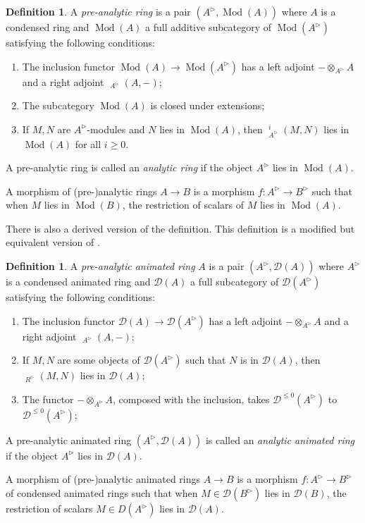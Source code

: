 \documentclass{article}
\theoremstyle{plain}
\theoremstyle{definition}
\newtheorem{defi}[thm]{Definition}
\theoremstyle{remark}
\DeclareMathOperator{\Homs}{\underline{Hom}}
\DeclareMathOperator{\rhoms}{\underline{RHom}}
\DeclareMathOperator{\modcat}{Mod}
\DeclareMathOperator{\exts}{\underline{Ext}}
\newcommand{\huflag}{\triangleright}
\newcommand{\D}{\mathcal{D}}
\begin{document}
\begin{defi}
A \emph{pre-analytic ring} is a pair $ (A ^{\huflag}, \modcat (A)) $ where $ A $ is a condensed ring and
$ \modcat (A) $ a full additive subcategory of $ \modcat (A ^{\huflag}) $ satisfying the following conditions:

\begin{enumerate}
\item The inclusion functor $ \modcat (A)\to \modcat (A ^{\huflag}) $ has a left adjoint
$ -\otimes _{A ^{\huflag}} A $ and a right adjoint $ \Homs _{A ^{\huflag}} (A, -) $;
\item The subcategory $ \modcat (A) $ is closed under extensions;
\item If $ M,N $ are $ A ^{\huflag} $-modules and $ N $ lies in $ \modcat (A) $,
then $ \exts ^{i} _{A ^{\huflag}} (M, N) $ lies in $ \modcat (A) $ for all $ i\geq 0 $.
\end{enumerate}
A pre-analytic ring is called an \emph{analytic ring} if the object $ A ^{\huflag} $ lies in $ \modcat (A) $.

A morphism of (pre-)analytic rings $ A\to B $ is a morphism $ f: A ^{\huflag}\to B ^{\huflag} $ such that
when $ M $ lies in $ \modcat (B) $, the restriction of scalars of $ M $ lies in $ \modcat (A) $.
\end{defi}

There is also a derived version of the definition.
This definition is a modified but equivalent version of \cite[\href
{https://www.youtube.com/watch?v=YxSZ1mTIpaA\&list=PLx5f8IelFRgGmu6gmL-Kf\_Rl\_6Mm7juZO\&t=3962s}{Video 1, 1:06:02}]{ihesvid}.

\begin{defi}
A \emph{pre-analytic animated ring} $ A $ is a pair $ (A ^{\huflag}, \D(A)) $ where $ A ^{\huflag} $ is a condensed animated ring and
$ \D (A) $ a full subcategory of $ \D (A ^{\huflag}) $ satisfying the following conditions:

\begin{enumerate}
\item The inclusion functor $ \D (A)\to \D (A ^{\huflag}) $ has a left adjoint $ -\otimes _{A ^{\huflag}} A $
and a right adjoint $ \Homs _{A ^{\huflag}}(A, -) $;
\item If $ M,N $ are some objects of $ \D (A ^{\huflag}) $ such that $ N $ is in $\D (A) $, then $ \rhoms _{R ^{\huflag}} (M, N) $ lies in $ \D (A) $;
\item The functor $ -\otimes _{A ^{\huflag}} A $, composed with the inclusion, takes $ \D ^{\leq 0}(A ^{\huflag}) $ to $ \D ^{\leq 0}(A ^{\huflag}) $;
\end{enumerate}
A pre-analytic animated ring $ (A ^{\huflag}, \D (A)) $ is called an \emph{analytic animated ring} if
the object $ A ^{\huflag} $ lies in $ \D (A) $.

A morphism of (pre-)analytic animated rings $ A\to B $ is a morphism $ f: A ^{\huflag}\to B ^{\huflag} $ of condensed animated rings such that when
$ M\in \D (B ^{\huflag}) $ lies in $ \D (B) $, the restriction of scalars $ M \in D (A ^{\huflag}) $ lies in $ \D (A) $.
\end{defi}
\end{document}
